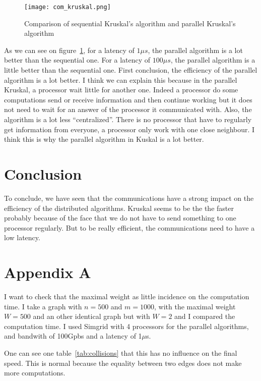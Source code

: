 \documentclass[
10pt, %
a4paper, %
oneside, %
headinclude,footinclude, %
BCOR5mm, %
]{scrartcl}
\begin{document}
\begin{figure}
  \centering
  \texttt{[image: com\_kruskal.png]}
  \caption{Comparison of sequential Kruskal's algorithm and parallel
    Kruskal's algorithm}
  \label{fig:comp_kruskal}
\end{figure}

As we can see on figure~\ref{fig:comp_kruskal}, for a latency of $1\mu
s$, the parallel algorithm is a lot better than the sequential
one. For a latency of $100 \mu s$, the parallel algorithm is a little
better than the sequential one. First conclusion, the efficiency of
the parallel algorithm is a lot better. I think we can explain this
because in the parallel Kruskal, a processor wait little for another
one. Indeed a processor do some computations send or receive
information and then continue working but it does not need to wait
for an answer of the processor it communicated with. Also, the
algorithm is a lot less ``centralized''. There is no processor that
have to regularly get information from everyone, a processor only
work with one close neighbour. I think this is why the parallel
algorithm in Kuskal is a lot better.

\section{Conclusion}

To conclude, we have seen that the communications have a strong impact
on the efficiency of the distributed algorithms. Kruskal seems to be
the the faster probably because of the face that we do not have to
send something to one processor regularly. But to be really efficient,
the communications need to have a low latency.

\newpage

\section*{Appendix A}
\label{sect:appendixa}
I want to check that the maximal weight as little incidence on the
computation time. I take a graph with $n=500$ and $m=1000$, with the
maximal weight $W=500$ and an other identical graph but with $W=2$ and
I compared the computation time. I used Simgrid with 4 processors for
the parallel algorithms, and bandwith of 100Gpbs and a latency of
1$\mu$s.

One can see one table~\ref{tab:collisions} that this has no influence
on the final speed. This is normal because the equality between two
edges does not make more computations.
\end{document}
